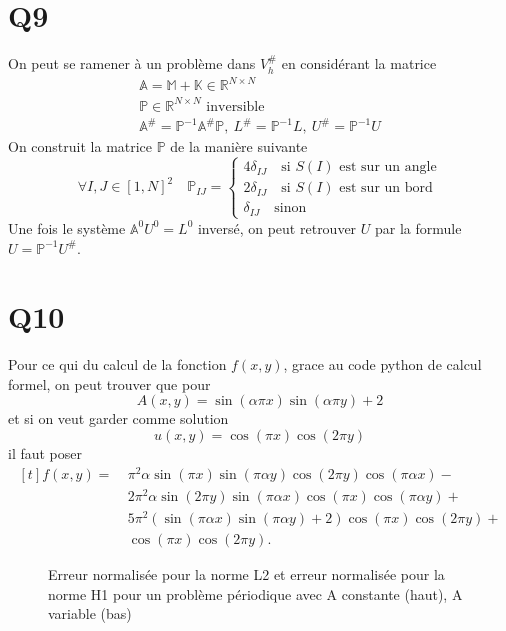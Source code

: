 \documentclass[11pt]{article}
\newcommand{\Am}{\mathbb{A}}
\renewcommand{\P}{\mathbb{P}}
\newcommand{\R}{\mathbb{R}}
\newcommand{\K}{\mathbb{K}}
\newcommand{\M}{\mathbb{M}}
\begin{document}
\section{Q9}

On peut se ramener à un problème dans $V^{\#}_h$ en considérant la matrice
\begin{gather}
  \Am = \M + \K \in \R^{N\times N } \\
  \P \in \R^{N\times N} \mbox{~inversible}\\
  \Am^{\#} = \P^{-1}\Am^{\#}\P, ~ L^{\#} = \P^{-1} L, ~ U^{\#} = \P^{-1} U 
\end{gather} 
On construit la matrice $\P$ de la manière suivante
\begin{equation}
  \forall I,J \in [1,N]^2 \quad
  \P_{IJ} =
  \begin{cases}
    4 \delta_{IJ} \quad \mbox{si~} S(I) \mbox{~est sur un angle} \\
    2 \delta_{IJ} \quad \mbox{si~} S(I) \mbox{~est sur un bord} \\
    \delta_{IJ} \quad \mbox{sinon}
  \end{cases}
\end{equation}
Une fois le système $\Am^0 U^0 = L^0$ inversé, on peut retrouver $U$ par la formule $U=\P^{-1} U^{\#}$.

\section{Q10}

Pour ce qui du calcul de la fonction $f(x,y)$, grace au code python de calcul formel, on peut trouver que pour
\begin{equation}
  A(x,y)= \sin(\alpha \pi x)\sin(\alpha \pi y) + 2
\end{equation}
et si on veut garder comme solution
\begin{equation}
  u(x,y)=\cos(\pi x)\cos(2\pi y)
\end{equation}
il faut poser
\begin{equation}
  \begin{aligned}[t]
    f(x,y) =~& \pi^2 \alpha \sin(\pi x)  \sin(\pi \alpha y)  \cos(2 \pi y)  \cos(\pi \alpha x) - \\
          &2 \pi^2 \alpha \sin(2 \pi y)  \sin(\pi \alpha x)  \cos(\pi x)  \cos(\pi \alpha y) + \\
          &5 \pi^2 (\sin(\pi \alpha x)  \sin(\pi \alpha y) + 2)  \cos(\pi x)  \cos(2 \pi y) + \\
          &\cos(\pi x)  \cos(2 \pi y).
  \end{aligned}
\end{equation}

\begin{figure}
  \centering
  \caption{Erreur normalisée pour la norme L2 et erreur normalisée pour la norme H1 pour un problème périodique avec A constante (haut), A variable (bas)}
  \label{fig:avar}
\end{figure}
\end{document}
